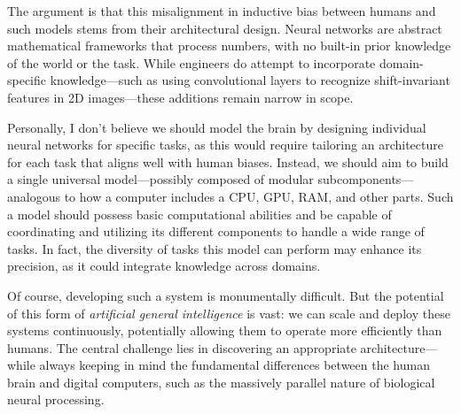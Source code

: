 \documentclass[../../main.tex]{subfiles}
\begin{document}
    The argument is that this misalignment in inductive bias between humans and such models stems from their architectural design. Neural networks are abstract mathematical frameworks that process numbers, with no built-in prior knowledge of the world or the task. While engineers do attempt to incorporate domain-specific knowledge—such as using convolutional layers to recognize shift-invariant features in 2D images—these additions remain narrow in scope.

    Personally, I don't believe we should model the brain by designing individual neural networks for specific tasks, as this would require tailoring an architecture for each task that aligns well with human biases. Instead, we should aim to build a single universal model—possibly composed of modular subcomponents—analogous to how a computer includes a CPU, GPU, RAM, and other parts. Such a model should possess basic computational abilities and be capable of coordinating and utilizing its different components to handle a wide range of tasks. In fact, the diversity of tasks this model can perform may enhance its precision, as it could integrate knowledge across domains.

    Of course, developing such a system is monumentally difficult. But the potential of this form of \emph{artificial general intelligence} is vast: we can scale and deploy these systems continuously, potentially allowing them to operate more efficiently than humans. The central challenge lies in discovering an appropriate architecture—while always keeping in mind the fundamental differences between the human brain and digital computers, such as the massively parallel nature of biological neural processing.
\end{document}
